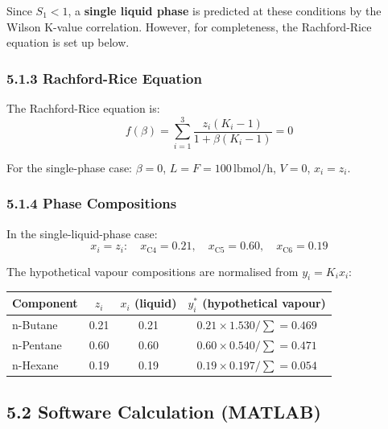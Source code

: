 \documentclass[12pt,a4paper]{article}
\begin{document}
Since $S_1 < 1$, a \textbf{single liquid phase} is predicted at these conditions by the Wilson
K-value correlation. However, for completeness, the Rachford-Rice equation is set up below.

\subsubsection{5.1.3 Rachford-Rice Equation}

The Rachford-Rice equation is:
\[
f(\beta) = \sum_{i=1}^{3} \frac{z_i(K_i - 1)}{1 + \beta(K_i - 1)} = 0
\]

For the single-phase case: $\beta = 0$, $L = F = 100\,\text{lbmol/h}$, $V = 0$, $x_i = z_i$.

\subsubsection{5.1.4 Phase Compositions}

In the single-liquid-phase case:
\[
x_i = z_i: \quad x_{\text{C4}} = 0.21,\quad x_{\text{C5}} = 0.60,\quad x_{\text{C6}} = 0.19
\]

The hypothetical vapour compositions are normalised from $y_i = K_i x_i$:

\begin{center}
\begin{tabular}{lccc}
  \toprule
  \textbf{Component} & $z_i$ & $x_i$ (liquid) & $y_i^*$ (hypothetical vapour) \\
  \midrule
  n-Butane   & 0.21 & 0.21 & $0.21 \times 1.530 / \sum = 0.469$ \\
  n-Pentane  & 0.60 & 0.60 & $0.60 \times 0.540 / \sum = 0.471$ \\
  n-Hexane   & 0.19 & 0.19 & $0.19 \times 0.197 / \sum = 0.054$ \\
  \bottomrule
\end{tabular}
\end{center}

\subsection{5.2 Software Calculation (MATLAB)}
\end{document}
